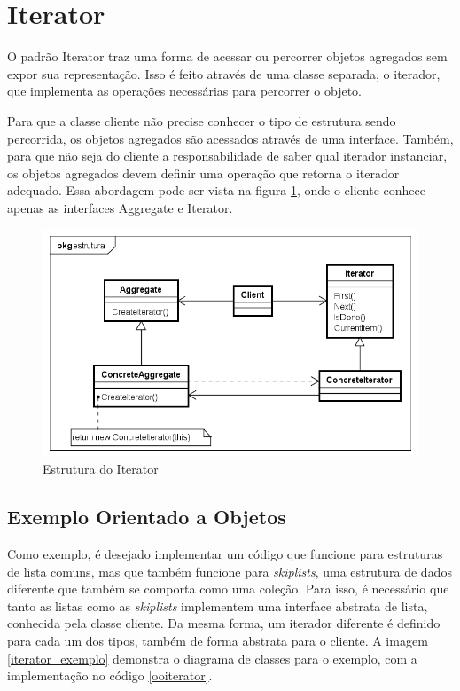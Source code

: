 \section{Iterator}

O padrão Iterator traz uma forma de acessar ou 
percorrer objetos agregados sem expor sua representação. 
Isso é feito através de uma classe separada, o iterador, 
que implementa as operações necessárias para percorrer 
o objeto. 

Para que a classe cliente não precise conhecer o tipo 
de estrutura sendo percorrida, os objetos agregados 
são acessados através de uma interface. Também, para 
que não seja do cliente a responsabilidade de saber 
qual iterador instanciar, os objetos agregados devem 
definir uma operação que retorna o iterador adequado. 
Essa abordagem pode ser vista na figura \ref{iterator_struct}, 
onde o cliente conhece apenas as interfaces 
Aggregate e Iterator.

\begin{figure}[htb]
	\caption{\label{iterator_struct}Estrutura do Iterator}
	\begin{center}
	    \includegraphics[scale=0.5]{5_padroes-contexto-funcional/5.3_comportamentais/5.3.04_iterator/iterator_struct.png}
	\end{center}
\end{figure}

\subsection*{Exemplo Orientado a Objetos}

Como exemplo, é desejado implementar um código 
que funcione para estruturas de lista comuns, mas 
que também funcione para \textit{skiplists}, uma 
estrutura de dados diferente que também se comporta 
como uma coleção. Para isso, é necessário que 
tanto as listas como as \textit{skiplists} implementem 
uma interface abstrata de lista, conhecida pela 
classe cliente. Da mesma forma, um iterador diferente 
é definido para cada um dos tipos, também de forma 
abstrata para o cliente. A imagem \ref{iterator_exemplo} 
demonstra o diagrama de classes para o exemplo, com a 
implementação no código \ref{ooiterator}.

